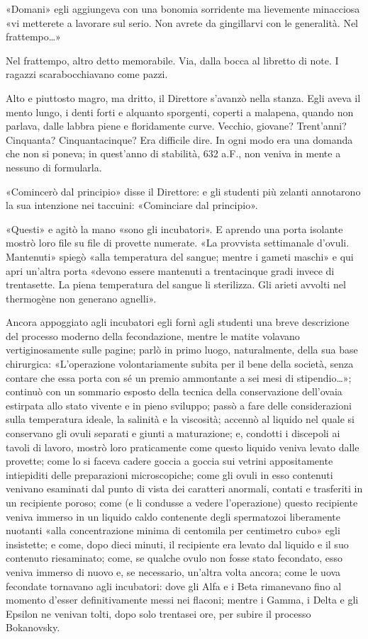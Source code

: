 \documentclass[
a5paper, %
10pt, %
twoside, 
onecolumn, %
openany, %
]{memoir}
\begin{document}
«Domani» egli aggiungeva con una bonomia sorridente ma lievemente minacciosa «vi metterete a lavorare sul serio. Non avrete da gingillarvi con le generalità. Nel frattempo…»

Nel frattempo, altro detto memorabile. Via, dalla bocca al libretto di note. I ragazzi scarabocchiavano come pazzi.

Alto e piuttosto magro, ma dritto, il Direttore s’avanzò nella stanza. Egli aveva il mento lungo, i denti forti e alquanto sporgenti, coperti a malapena, quando non parlava, dalle labbra piene e floridamente curve. Vecchio, giovane? Trent’anni? Cinquanta? Cinquantacinque? Era difficile dire. In ogni modo era una domanda che non si poneva; in quest’anno di stabilità, 632 a.F., non veniva in mente a nessuno di formularla.

«Comincerò dal principio» disse il Direttore: e gli studenti più zelanti annotarono la sua intenzione nei taccuini: «Cominciare dal principio».

«Questi» e agitò la mano «sono gli incubatori». E aprendo una porta isolante mostrò loro file su file di provette numerate. «La provvista settimanale d’ovuli. Mantenuti» spiegò «alla temperatura del sangue; mentre i gameti maschi» e qui apri un’altra porta «devono essere mantenuti a trentacinque gradi invece di trentasette. La piena temperatura del sangue li sterilizza. Gli arieti avvolti nel thermogène non generano agnelli».

Ancora appoggiato agli incubatori egli fornì agli studenti una breve descrizione del processo moderno della fecondazione, mentre le matite volavano vertiginosamente sulle pagine; parlò in primo luogo, naturalmente, della sua base chirurgica: «L’operazione volontariamente subita per il bene della società, senza contare che essa porta con sé un premio ammontante a sei mesi di stipendio…»; continuò con un sommario esposto della tecnica della conservazione dell’ovaia estirpata allo stato vivente e in pieno sviluppo; passò a fare delle considerazioni sulla temperatura ideale, la salinità e la viscosità; accennò al liquido nel quale si conservano gli ovuli separati e giunti a maturazione; e, condotti i discepoli ai tavoli di lavoro, mostrò loro praticamente come questo liquido veniva levato dalle provette; come lo si faceva cadere goccia a goccia sui vetrini appositamente intiepiditi delle preparazioni microscopiche; come gli ovuli in esso contenuti venivano esaminati dal punto di vista dei caratteri anormali, contati e trasferiti in un recipiente poroso; come (e li condusse a vedere l’operazione) questo recipiente veniva immerso in un liquido caldo contenente degli spermatozoi liberamente nuotanti «alla concentrazione minima di centomila per centimetro cubo» egli insistette; e come, dopo dieci minuti, il recipiente era levato dal liquido e il suo contenuto riesaminato; come, se qualche ovulo non fosse stato fecondato, esso veniva immerso di nuovo e, se necessario, un’altra volta ancora; come le uova fecondate tornavano agli incubatori: dove gli Alfa e i Beta rimanevano fino al momento d’esser definitivamente messi nei flaconi; mentre i Gamma, i Delta e gli Epsilon ne venivan tolti, dopo solo trentasei ore, per subire il processo Bokanovsky.
\end{document}
